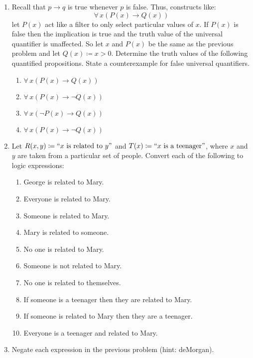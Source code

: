 \documentclass[letterpaper,12pt,fleqn]{article}
\renewcommand{\implies}{\rightarrow}
\begin{document}
\begin{enumerate}[left=0in,itemsep=0.5in]
\item Recall that \(p\implies q\) is true whenever \(p\) is false.  Thus, constructs like:
  \[\forall\,x(P(x)\implies Q(x))\]
  let \(P(x)\) act like a filter to only select particular values of \(x\).  If \(P(x)\) is false then the
  implication is true and the truth value of the universal quantifier is unaffected.  So let \(x\) and \(P(x)\)
  be the same as the previous problem and let \(Q(x)\coloneqq x>0\).  Determine the truth values of the following
  quantified propositions.  State a counterexample for false universal quantifiers.
  \begin{enumerate}
  \item \(\forall\,x(P(x)\implies Q(x))\)
  \item \(\forall\,x(P(x)\implies\lnot Q(x))\)
  \item \(\forall\,x(\lnot P(x)\implies Q(x))\)
  \item \(\forall\,x(P(x)\implies\lnot Q(x))\)
  \end{enumerate}

\item Let \(R(x,y)\coloneqq ``x\ \text{is related to}\ y\text{''}\) and \(T(x)\coloneqq ``x\ \text{is a teenager''}\),
  where \(x\) and \(y\) are taken from a particular set of people.  Convert each of the following to logic
  expressions:
  \begin{enumerate}
  \item George is related to Mary.
  \item Everyone is related to Mary.
  \item Someone is related to Mary.
  \item Mary is related to someone.
  \item No one is related to Mary.
  \item Someone is not related to Mary.
  \item No one is related to themselves.
  \item If someone is a teenager then they are related to Mary.
  \item If someone is related to Mary then they are a teenager.
  \item Everyone is a teenager and related to Mary.
  \end{enumerate}

\item Negate each expression in the previous problem (hint: deMorgan).


\end{enumerate}
\end{document}
